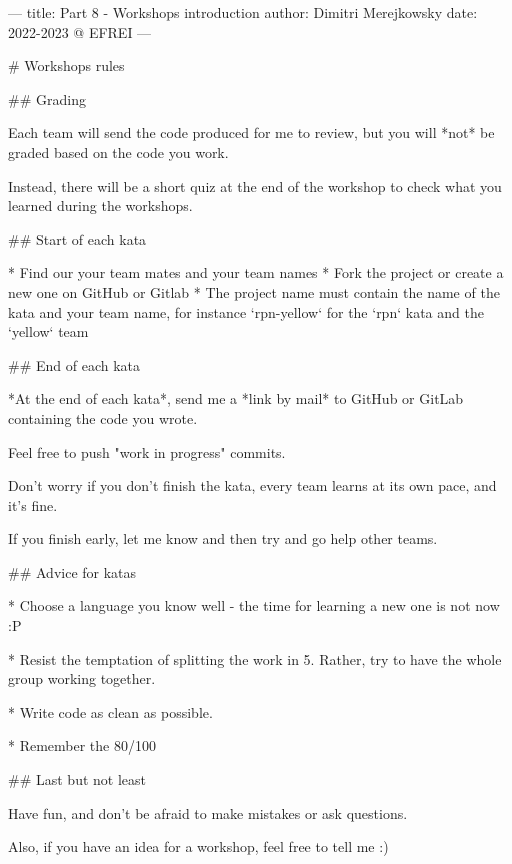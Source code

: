 ---
title: Part 8 - Workshops introduction
author: Dimitri Merejkowsky
date: 2022-2023 @ EFREI
---

# Workshops rules

## Grading

Each team will send the code produced for me to review, but you will
*not* be graded based on the code you work.

\vfill

Instead, there will be a short quiz at the end of the workshop
to check what you learned during the workshops.

## Start of each kata

* Find our your team mates and your team names
* Fork the project or create a new one on GitHub or Gitlab
* The project name must contain the name of the kata and your team name,
  for instance `rpn-yellow` for the `rpn` kata and the `yellow` team

## End of each kata

*At the end of each kata*, send me a *link by mail* to GitHub or GitLab
containing the code you wrote.

Feel free to push "work in progress" commits.

Don't worry if you don't finish the kata, every team learns at its own pace,
and it's fine.

If you finish early, let me know and then try and go help other teams.

## Advice for katas

* Choose a language you know well - the time for learning a new one is
  not now :P

* Resist the temptation of splitting the work in 5. Rather, try to
  have the whole group working together.

* Write code as clean as possible.

* Remember the 80/100%

## Last but not least

Have fun, and don't be afraid to make mistakes or ask questions.

Also, if you have an idea for a workshop, feel free to tell me :)
